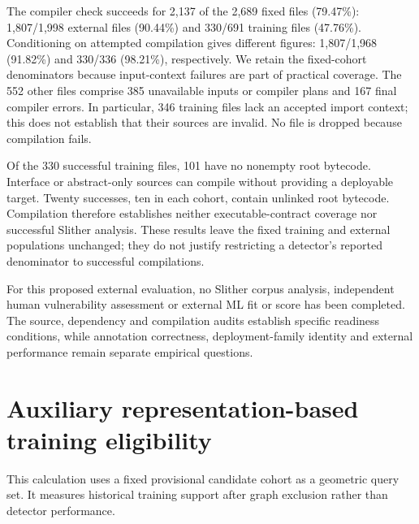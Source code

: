 \documentclass[preprint,12pt]{elsarticle}
\begin{document}
The compiler check succeeds for 2,137 of the 2,689 fixed files (79.47\%): 1,807/1,998 external files (90.44\%) and 330/691 training files (47.76\%). Conditioning on attempted compilation gives different figures: 1,807/1,968 (91.82\%) and 330/336 (98.21\%), respectively. We retain the fixed-cohort denominators because input-context failures are part of practical coverage. The 552 other files comprise 385 unavailable inputs or compiler plans and 167 final compiler errors. In particular, 346 training files lack an accepted import context; this does not establish that their sources are invalid. No file is dropped because compilation fails.

Of the 330 successful training files, 101 have no nonempty root bytecode. Interface or abstract-only sources can compile without providing a deployable target. Twenty successes, ten in each cohort, contain unlinked root bytecode. Compilation therefore establishes neither executable-contract coverage nor successful Slither analysis. These results leave the fixed training and external populations unchanged; they do not justify restricting a detector's reported denominator to successful compilations.

For this proposed external evaluation, no Slither corpus analysis, independent human vulnerability assessment or external ML fit or score has been completed. The source, dependency and compilation audits establish specific readiness conditions, while annotation correctness, deployment-family identity and external performance remain separate empirical questions.

\section{Auxiliary representation-based training eligibility}\label{auxiliary-representation-based-training-eligibility}

This calculation uses a fixed provisional candidate cohort as a geometric query set. It measures historical training support after graph exclusion rather than detector performance.
\end{document}

